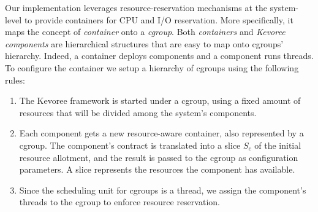 Our implementation leverages resource-reservation mechanisms at the system-level to provide containers for CPU and I/O reservation.
More specifically, it maps the concept of \textit{container} onto a \textit{cgroup}.
Both \textit{containers} and \textit{Kevoree components} are hierarchical structures that are easy to map onto cgroups' hierarchy.
Indeed, a container deploys components and a component runs threads.
To configure the container we setup a hierarchy of cgroups
using the following rules:
\begin{enumerate}
\item
The Kevoree framework is started under a cgroup, using a fixed amount of resources that will be divided among the system's components. 


\item
Each component gets a new resource-aware container, also represented by a cgroup.
The component's contract is translated into a slice $S_c$ of the initial resource allotment, and the result is passed to
the cgroup as configuration parameters.
A slice represents the
resources the component has available.

\item Since the scheduling unit for cgroups is a thread, we assign the component's threads to the cgroup to enforce resource reservation.

\end{enumerate}


